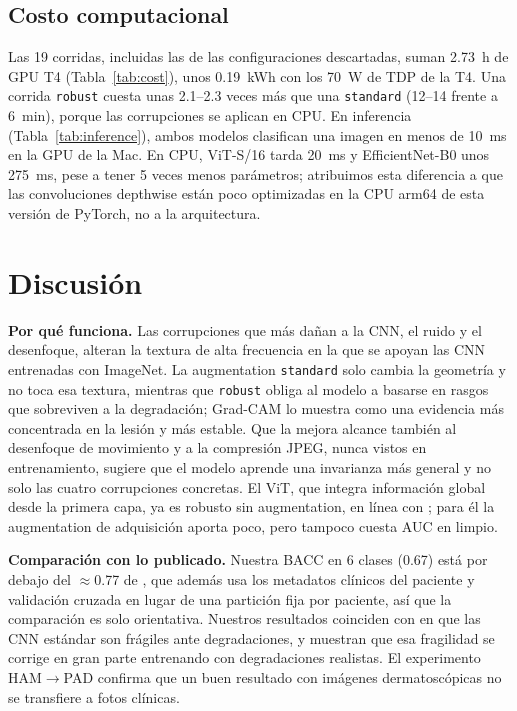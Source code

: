 \documentclass[conference]{IEEEtran}
\begin{document}
\subsection{Costo computacional}
Las 19 corridas, incluidas las de las configuraciones descartadas, suman 2.73~h de GPU T4 (Tabla~\ref{tab:cost}), unos 0.19~kWh con los 70~W de TDP de la T4. Una corrida \texttt{robust} cuesta unas 2.1--2.3 veces más que una \texttt{standard} (12--14 frente a 6~min), porque las corrupciones se aplican en CPU. En inferencia (Tabla~\ref{tab:inference}), ambos modelos clasifican una imagen en menos de 10~ms en la GPU de la Mac. En CPU, ViT-S/16 tarda 20~ms y EfficientNet-B0 unos 275~ms, pese a tener 5 veces menos parámetros; atribuimos esta diferencia a que las convoluciones depthwise están poco optimizadas en la CPU arm64 de esta versión de PyTorch, no a la arquitectura.

\section{Discusión}
\label{sec:discussion}

\textbf{Por qué funciona.} Las corrupciones que más dañan a la CNN, el ruido y el desenfoque, alteran la textura de alta frecuencia en la que se apoyan las CNN entrenadas con ImageNet. La augmentation \texttt{standard} solo cambia la geometría y no toca esa textura, mientras que \texttt{robust} obliga al modelo a basarse en rasgos que sobreviven a la degradación; Grad-CAM lo muestra como una evidencia más concentrada en la lesión y más estable. Que la mejora alcance también al desenfoque de movimiento y a la compresión JPEG, nunca vistos en entrenamiento, sugiere que el modelo aprende una invarianza más general y no solo las cuatro corrupciones concretas. El ViT, que integra información global desde la primera capa, ya es robusto sin augmentation, en línea con \cite{bhojanapalli2021}; para él la augmentation de adquisición aporta poco, pero tampoco cuesta AUC en limpio.

\textbf{Comparación con lo publicado.} Nuestra BACC en 6 clases (0.67) está por debajo del $\approx$0.77 de \cite{pacheco2021metablock}, que además usa los metadatos clínicos del paciente y validación cruzada en lugar de una partición fija por paciente, así que la comparación es solo orientativa. Nuestros resultados coinciden con \cite{maron2021,young2021} en que las CNN estándar son frágiles ante degradaciones, y muestran que esa fragilidad se corrige en gran parte entrenando con degradaciones realistas. El experimento HAM$\to$PAD confirma que un buen resultado con imágenes dermatoscópicas no se transfiere a fotos clínicas.
\end{document}
